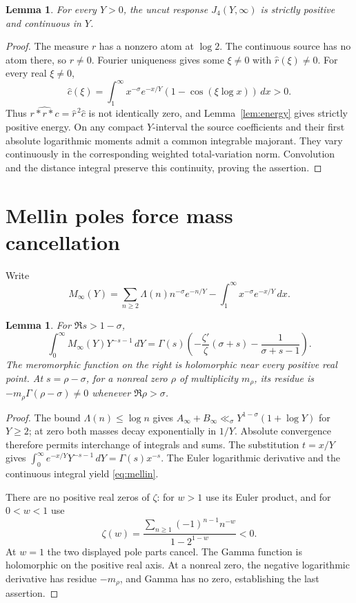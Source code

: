 \documentclass[11pt,a4paper]{article}
\newtheorem{lemma}[theorem]{Lemma}
\theoremstyle{definition}
\theoremstyle{remark}
\newcommand{\dd}{\,d}
\begin{document}
\begin{lemma}\label{lem:positive}
For every \(Y>0\), the uncut response \(J_4(Y,\infty)\) is strictly
positive and continuous in \(Y\).
\end{lemma}
\begin{proof}
The measure \(r\) has a nonzero atom at \(\log2\). The continuous
source has no atom there, so \(r\ne0\).
Fourier uniqueness gives some \(\xi\ne0\) with \(\widehat r(\xi)\ne0\).
For every real \(\xi\ne0\),
\[
 \widehat c(\xi)=\int_1^\infty x^{-\sigma}e^{-x/Y}
                    (1-\cos(\xi\log x))\dd x>0.
\]
Thus \(\widehat{r*r*c}=\widehat r^{\,2}\widehat c\) is not identically
zero, and Lemma~\ref{lem:energy} gives strictly positive energy.
On any compact \(Y\)-interval the source coefficients and their
first absolute logarithmic moments admit a common integrable
majorant. They vary continuously in the corresponding weighted
total-variation norm. Convolution and the distance integral preserve
this continuity, proving the assertion.
\end{proof}

\section{Mellin poles force mass cancellation}

Write
\[
 M_\infty(Y)=
 \sum_{n\ge2}\Lambda(n)n^{-\sigma}e^{-n/Y}
 -\int_1^\infty x^{-\sigma}e^{-x/Y}\dd x.
\]
\begin{lemma}\label{lem:mellin}
For \(\Re s>1-\sigma\),
\begin{equation}
 \int_0^\infty M_\infty(Y)Y^{-s-1}\dd Y
 =\Gamma(s)\left(-\frac{\zeta'}{\zeta}(\sigma+s)
                       -\frac1{\sigma+s-1}\right).
 \label{eq:mellin}
\end{equation}
The meromorphic function on the right is holomorphic near every
positive real point. At \(s=\rho-\sigma\), for a nonreal zero \(\rho\)
of multiplicity \(m_\rho\), its residue is
\(-m_\rho\Gamma(\rho-\sigma)\ne0\) whenever \(\Re\rho>\sigma\).
\end{lemma}
\begin{proof}
The bound \(\Lambda(n)\le\log n\) gives
\(A_\infty+B_\infty\ll_\sigma Y^{1-\sigma}(1+\log Y)\) for \(Y\ge2\);
at zero both masses decay exponentially in \(1/Y\).
Absolute convergence therefore permits interchange of integrals and
sums. The substitution \(t=x/Y\) gives
\(\int_0^\infty e^{-x/Y}Y^{-s-1}\dd Y=\Gamma(s)x^{-s}\).
The Euler logarithmic derivative and the continuous integral yield
\eqref{eq:mellin}.

There are no positive real zeros of \(\zeta\): for \(w>1\) use its
Euler product, and for \(0<w<1\) use
\[
 \zeta(w)=\frac{\sum_{n\ge1}(-1)^{n-1}n^{-w}}{1-2^{1-w}}<0.
\]
At \(w=1\) the two displayed pole parts cancel. The Gamma function
is holomorphic on the positive real axis. At a nonreal zero,
the negative logarithmic derivative has residue \(-m_\rho\), and Gamma has
no zero, establishing the last assertion.
\end{proof}
\end{document}
